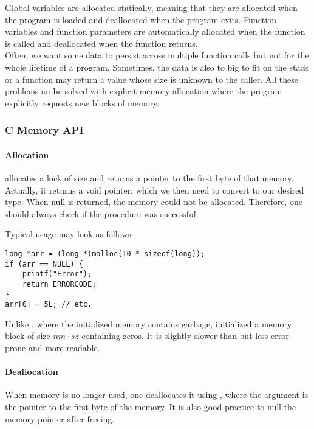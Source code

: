 

Global variables are allocated statically, meaning that they are allocated when the program is loaded and deallocated when the program exits. Function variables and function parameters are automatically allocated when the function is called and deallocated when the function returns.\\
Often, we want some data to persist across multiple function calls but not for the whole lifetime of a program. Sometimes, the data is also to big to fit on the stack or a function may return a value whose size is unknown to the caller. All these problems an be solved with explicit memory allocation where the program explicitly requests new blocks of memory.

\subsubsection{C Memory API}
\paragraph{Allocation}
 allocates a lock of size  and returns a pointer to the first byte of that memory. Actually, it returns a void pointer, which we then need to convert to our desired type. When null is returned, the memory could not be allocated. Therefore, one should always check if the procedure was successful. 

Typical usage may look as follows:
\begin{lstlisting}
long *arr = (long *)malloc(10 * sizeof(long));
if (arr == NULL) {
    printf("Error");
    return ERRORCODE;
}
arr[0] = 5L; // etc.
\end{lstlisting}

Unlike , where the initialized memory contains garbage, initialized a memory block of size $nm \cdot sz$ containing zeros. It is slightly slower than  but less error-prone and more readable. %

\paragraph{Deallocation}
When memory is no longer used, one deallocates it using , where the argument is the pointer to the first byte of the memory. It is also good practice to null the memory pointer after freeing.

